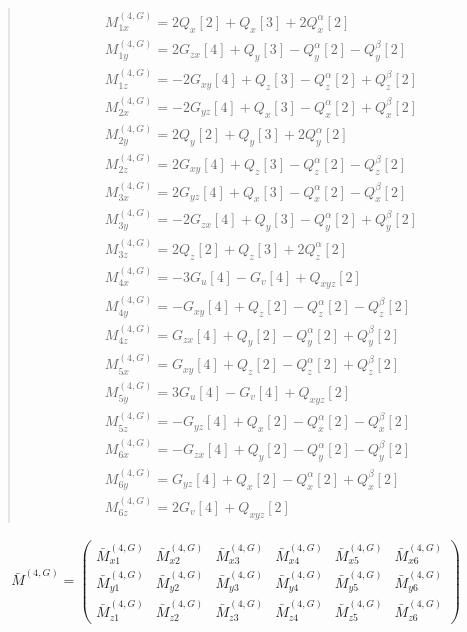 \documentclass[fleqn,10pt]{jsarticle}
\begin{document}
\begin{quote}
\begin{align*}
& M^{(4,G)}_{1x} = 2 Q_{x}[2] + Q_{x}[3] + 2 Q_{x}^{\alpha}[2] \\
& M^{(4,G)}_{1y} = 2 G_{zx}[4] + Q_{y}[3] - Q_{y}^{\alpha}[2] - Q_{y}^{\beta}[2] \\
& M^{(4,G)}_{1z} = - 2 G_{xy}[4] + Q_{z}[3] - Q_{z}^{\alpha}[2] + Q_{z}^{\beta}[2] \\
& M^{(4,G)}_{2x} = - 2 G_{yz}[4] + Q_{x}[3] - Q_{x}^{\alpha}[2] + Q_{x}^{\beta}[2] \\
& M^{(4,G)}_{2y} = 2 Q_{y}[2] + Q_{y}[3] + 2 Q_{y}^{\alpha}[2] \\
& M^{(4,G)}_{2z} = 2 G_{xy}[4] + Q_{z}[3] - Q_{z}^{\alpha}[2] - Q_{z}^{\beta}[2] \\
& M^{(4,G)}_{3x} = 2 G_{yz}[4] + Q_{x}[3] - Q_{x}^{\alpha}[2] - Q_{x}^{\beta}[2] \\
& M^{(4,G)}_{3y} = - 2 G_{zx}[4] + Q_{y}[3] - Q_{y}^{\alpha}[2] + Q_{y}^{\beta}[2] \\
& M^{(4,G)}_{3z} = 2 Q_{z}[2] + Q_{z}[3] + 2 Q_{z}^{\alpha}[2] \\
& M^{(4,G)}_{4x} = - 3 G_{u}[4] - G_{v}[4] + Q_{xyz}[2] \\
& M^{(4,G)}_{4y} = - G_{xy}[4] + Q_{z}[2] - Q_{z}^{\alpha}[2] - Q_{z}^{\beta}[2] \\
& M^{(4,G)}_{4z} = G_{zx}[4] + Q_{y}[2] - Q_{y}^{\alpha}[2] + Q_{y}^{\beta}[2] \\
& M^{(4,G)}_{5x} = G_{xy}[4] + Q_{z}[2] - Q_{z}^{\alpha}[2] + Q_{z}^{\beta}[2] \\
& M^{(4,G)}_{5y} = 3 G_{u}[4] - G_{v}[4] + Q_{xyz}[2] \\
& M^{(4,G)}_{5z} = - G_{yz}[4] + Q_{x}[2] - Q_{x}^{\alpha}[2] - Q_{x}^{\beta}[2] \\
& M^{(4,G)}_{6x} = - G_{zx}[4] + Q_{y}[2] - Q_{y}^{\alpha}[2] - Q_{y}^{\beta}[2] \\
& M^{(4,G)}_{6y} = G_{yz}[4] + Q_{x}[2] - Q_{x}^{\alpha}[2] + Q_{x}^{\beta}[2] \\
& M^{(4,G)}_{6z} = 2 G_{v}[4] + Q_{xyz}[2]
\end{align*}
\end{quote}
\begin{align*}
\bar{M}^{(4,G)} = \begin{pmatrix} \bar{M}^{(4,G)}_{x1} & \bar{M}^{(4,G)}_{x2} & \bar{M}^{(4,G)}_{x3} & \bar{M}^{(4,G)}_{x4} & \bar{M}^{(4,G)}_{x5} & \bar{M}^{(4,G)}_{x6} \\ \bar{M}^{(4,G)}_{y1} & \bar{M}^{(4,G)}_{y2} & \bar{M}^{(4,G)}_{y3} & \bar{M}^{(4,G)}_{y4} & \bar{M}^{(4,G)}_{y5} & \bar{M}^{(4,G)}_{y6} \\ \bar{M}^{(4,G)}_{z1} & \bar{M}^{(4,G)}_{z2} & \bar{M}^{(4,G)}_{z3} & \bar{M}^{(4,G)}_{z4} & \bar{M}^{(4,G)}_{z5} & \bar{M}^{(4,G)}_{z6} \end{pmatrix}
\end{align*}
\end{document}
